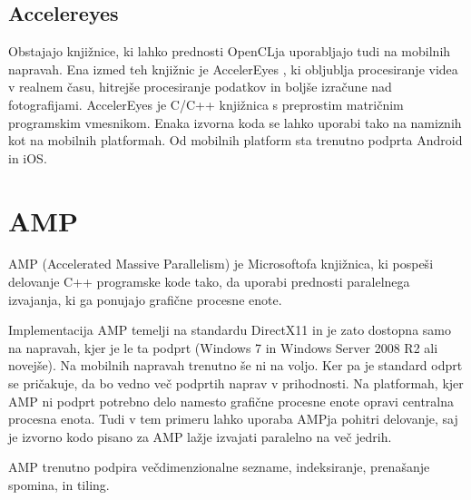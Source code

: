 \subsection{Accelereyes}

Obstajajo knjižnice, ki lahko prednosti OpenCLja uporabljajo tudi na mobilnih napravah. Ena izmed teh knjižnic je AccelerEyes \cite{accelereyes}, ki obljublja procesiranje videa v realnem času, hitrejše procesiranje podatkov in boljše izračune nad fotografijami. AccelerEyes je C/C++ knjižnica s preprostim matričnim programskim vmesnikom. Enaka izvorna koda se lahko uporabi tako na namiznih kot na mobilnih platformah. Od mobilnih platform sta trenutno podprta Android in iOS.

\section{AMP}

AMP (Accelerated Massive Parallelism) je Microsoftofa knjižnica, ki pospeši delovanje C++ programske kode tako, da uporabi prednosti paralelnega izvajanja, ki ga ponujajo grafične procesne enote. 

Implementacija AMP temelji na standardu DirectX11 in je zato dostopna samo na napravah, kjer je le ta podprt (Windows 7 in Windows Server 2008 R2 ali novejše). Na mobilnih napravah trenutno še ni na voljo. Ker pa je standard odprt se pričakuje, da bo vedno več podprtih naprav v prihodnosti. Na platformah, kjer AMP ni podprt potrebno delo namesto grafične procesne enote opravi centralna procesna enota. Tudi v tem primeru lahko uporaba AMPja pohitri delovanje, saj je izvorno kodo pisano za AMP lažje izvajati paralelno na več jedrih.

AMP trenutno podpira večdimenzionalne sezname, indeksiranje, prenašanje spomina, in tiling.
